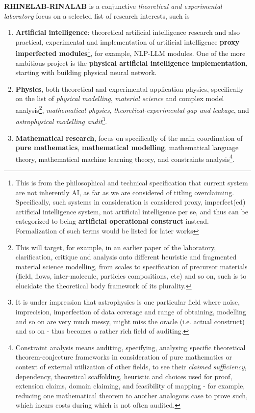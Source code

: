 \documentclass[9pt,a4paper]{article}
\begin{document}
\textbf{RHINELAB-RINALAB} is a conjunctive \textit{theoretical and experimental laboratory} focus on a selected list of research interests, such is 
\begin{enumerate}[topsep=0pt,itemsep=0pt]
    \item \textbf{Artificial intelligence}: theoretical artificial intelligence research and also practical, experimental and implementation of artificial intelligence \textbf{proxy imperfected modules}\footnote{This is from the philosophical and technical specification that current system are not inherently AI, as far as we are considered of titling overclaiming. Specifically, such systems in consideration is considered proxy, imperfect(ed) artificial intelligence system, not artificial intelligence per se, and thus can be categorized to being \textbf{artificial operational construct} instead. Formalization of such terms would be listed for later works}, for example, NLP-LLM modules. One of the more ambitious project is the \textbf{physical artificial intelligence implementation}, starting with building physical neural network. 
    \item \textbf{Physics}, both theoretical and experimental-application physics, specifically on the list of \textit{physical modelling}, \textit{material science} and complex model analysis\footnote{This will target, for example, in an earlier paper of the laboratory, clarification, critique and analysis onto different heuristic and fragmented material science modelling, from scales to specification of precursor materials (field, flows, inter-molecule, particles compositions, etc) and so on, such is to elucidate the theoretical body framework of its plurality.}, \textit{mathematical physics}, \textit{theoretical-experimental gap and leakage}, and \textit{astrophysical modelling audit}\footnote{It is under impression that astrophysics is one particular field where noise, imprecision, imperfection of data coverage and range of obtaining, modelling and so on are very much messy, might miss the oracle (i.e. actual construct) and so on - thus becomes a rather rich field of auditing.}. 
    \item \textbf{Mathematical research}, focus on specifically of the main coordination of \textbf{pure mathematics}, \textbf{mathematical modelling}, mathematical language theory, mathematical machine learning theory, and constraints analysis\footnote{Constraint analysis means auditing, specifying, analysing specific theoretical theorem-conjecture frameworks in consideration of pure mathematics or context of external utilization of other fields, to see their \textit{claimed sufficiency}, dependency, theoretical scaffolding, heuristic and choices used for proof, extension claims, domain claiming, and feasibility of mapping - for example, reducing one mathematical theorem to another analogous case to prove such, which incurs costs during which is not often audited.}.
\end{enumerate}
\end{document}
